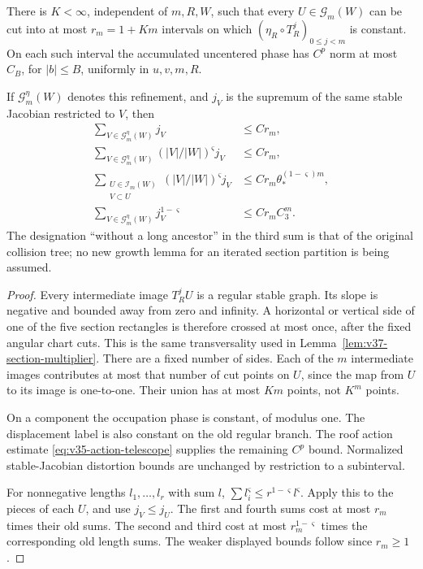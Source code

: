\begin{lemma}
\label{lem:v40-linear-cuts}
There is $K<\infty$, independent of $m,R,W$, such that every
$U\in\mathcal G_m(W)$ can be cut into at most $r_m=1+Km$ intervals
on which $(\eta_R\circ T_R^j)_{0\le j<m}$ is constant. On each such
interval the accumulated uncentered phase has $C^p$ norm at most
$C_B$, for $|b|\le B$, uniformly in $u,v,m,R$.

If $\mathcal G_m^\eta(W)$ denotes this refinement, and $j_V$ is the
supremum of the same stable Jacobian restricted to $V$, then
\begin{align}
 \sum_{V\in\mathcal G_m^\eta(W)}j_V&\le Cr_m,
                                      \label{eq:v40-cut-sums-a}\\
 \sum_{V\in\mathcal G_m^\eta(W)}(|V|/|W|)^\varsigma j_V&\le Cr_m,
                                      \label{eq:v40-cut-sums-b}\\
 \sum_{\substack{U\in\mathcal I_m(W)\\V\subset U}}
            (|V|/|W|)^\varsigma j_V
       &\le Cr_m\theta_*^{(1-\varsigma)m},
                                      \label{eq:v40-cut-sums-c}\\
 \sum_{V\in\mathcal G_m^\eta(W)}j_V^{1-\varsigma}&\le Cr_m C_3^m.
                                      \label{eq:v40-cut-sums-d}
\end{align}
The designation ``without a long ancestor'' in the third sum is that
of the original collision tree; no new growth lemma for an iterated
section partition is being assumed.
\end{lemma}
\begin{proof}
Every intermediate image $T_R^jU$ is a regular stable graph. Its slope
is negative and bounded away from zero and infinity. A horizontal or
vertical side of one of the five section rectangles is therefore
crossed at most once, after the fixed angular chart cuts. This is the
same transversality used in Lemma~\ref{lem:v37-section-multiplier}.
There are a fixed number of sides. Each of the $m$ intermediate images
contributes at most that number of cut points on $U$, since the map
from $U$ to its image is one-to-one. Their union has at most $Km$
points, not $K^m$ points.

On a component the occupation phase is constant, of modulus one.
The displacement label is also constant on the old regular branch.
The roof action estimate \eqref{eq:v35-action-telescope} supplies the
remaining $C^p$ bound. Normalized stable-Jacobian distortion bounds
are unchanged by restriction to a subinterval.

For nonnegative lengths $l_1,\ldots,l_r$ with sum $l$,
$\sum l_i^\varsigma\le r^{1-\varsigma}l^\varsigma$. Apply this to the
pieces of each $U$, and use $j_V\le j_U$. The first and fourth sums
cost at most $r_m$ times their old sums. The second and third cost at
most $r_m^{1-\varsigma}$ times the corresponding old length sums.
The weaker displayed bounds follow since $r_m\ge1$.
\end{proof}


